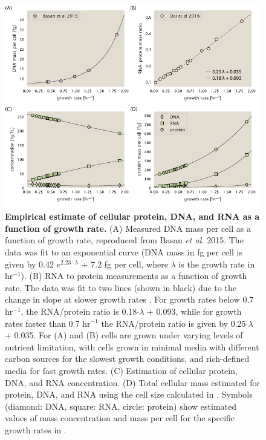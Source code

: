\begin{figure}
		\centering
    \includegraphics[width=1\textwidth]{SI_figs/figA4_schmidt_estimate_protein_RNA_DNA_corrections.pdf}
  \caption{{\bf Empirical estimate of cellular protein, DNA, and RNA as a
  function of growth rate.} (A) Measured DNA mass per cell as a function of
  growth rate, reproduced from Basan \textit{et al.} 2015. The data was fit to
  an exponential curve (DNA mass in fg per cell is given by 0.42 $e^{2.23 \cdot
  \lambda}$ + 7.2 fg per cell, where $\lambda$ is the growth rate in hr$^{-1}$).
  (B) RNA to protein measurements as a function of growth rate. The data was fit
  to two lines (shown in black) due to the change in slope at slower growth rates \cite{neidhardt1991, dai2016}.
  For growth rates below 0.7 hr$^{-1}$, the RNA/protein ratio is
  0.18$\cdot \lambda$ + 0.093, while for growth rates faster than 0.7 hr$^{-1}$
  the RNA/protein ratio is given by 0.25$\cdot \lambda$ + 0.035. For (A) and (B)
  cells are grown under varying levels of nutrient limitation, with cells grown
  in minimal media with different carbon sources for the slowest growth
  conditions, and rich-defined media for fast growth rates. (C) Estimation of
  cellular protein, DNA, and RNA concentration.  (D) Total cellular mass
  estimated for protein, DNA, and RNA using the cell size calculated in  . Symbols (diamond: DNA, square: RNA, circle: protein)
	show estimated values of mass concentration and mass per cell for the specific
	growth rates in \cite{schmidt2016}.
	 	}
  \label{fig:schmidt_adjustment_varying_conc}
\end{figure}

